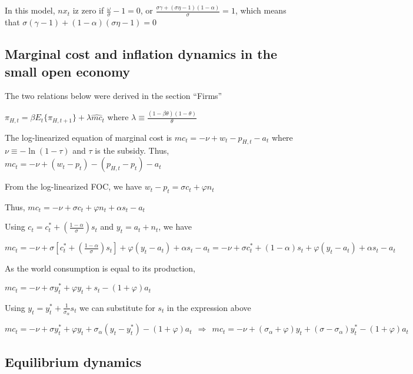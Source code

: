 \documentclass[
]{article}
\begin{document}
In this model, \(nx_t\) iz zero if
\(\displaystyle \frac{\omega}{\sigma} - 1=0\), or
\(\displaystyle \frac{\sigma \gamma + (\sigma \eta - 1)(1-\alpha)}{\sigma}=1\),
which means that \(\sigma (\gamma-1) + (1-\alpha)(\sigma \eta - 1)=0\)

\hypertarget{marginal-cost-and-inflation-dynamics-in-the-small-open-economy}{%
\subsection{Marginal cost and inflation dynamics in the small open
economy}\label{marginal-cost-and-inflation-dynamics-in-the-small-open-economy}}

The two relations below were derived in the section ``Firms''

\(\pi_{H,t} = \beta E_t \{ \pi_{H,t+1}\} + \lambda \widehat{mc}_t\)
where
\(\displaystyle \lambda \equiv \frac{(1-\beta \theta)(1-\theta)}{\theta}\)

The log-linearized equation of marginal cost is
\(mc_t = -\nu+w_t-p_{H,t}-a_t\) where \(\nu\equiv -\ln(1-\tau)\) and
\(\tau\) is the subsidy. Thus,
\(mc_t= -\nu + (w_t-p_t) - (p_{H,t}-p_t)-a_t\)

From the log-linearized FOC, we have
\(w_t-p_t=\sigma c_t + \varphi n_t\)

Thus, \(mc_t= -\nu + \sigma c_t + \varphi n_t + \alpha s_t -a_t\)

Using
\(\displaystyle c_t=c_t^*+ \left( \frac{1-\alpha}{\sigma} \right)s_t\)
and \(y_t = a_t + n_t\), we have

\(\displaystyle mc_t= -\nu + \sigma \left[ c_t^*+ \left( \frac{1-\alpha}{\sigma} \right)s_t \right] + \varphi (y_t-a_t) + \alpha s_t -a_t=-\nu + \sigma c_t^*+ ( 1-\alpha )s_t + \varphi (y_t-a_t) + \alpha s_t -a_t\)

As the world consumption is equal to its production,

\(\displaystyle mc_t =-\nu + \sigma y_t^*+ \varphi y_t+ s_t -(1+\varphi)a_t\)

Using \(\displaystyle y_t = y_t^* + \frac{1}{\sigma_\alpha}s_t\) we can
substitute for \(s_t\) in the expression above

\(\displaystyle mc_t =-\nu + \sigma y_t^*+ \varphi y_t+ \sigma_\alpha(y_t-y_t^*) -(1+\varphi)a_t \ \ \Rightarrow \ \ mc_t = -\nu + (\sigma_\alpha+\varphi)y_t + (\sigma-\sigma_\alpha)y_t^*-(1+\varphi)a_t\)

\hypertarget{equilibrium-dynamics}{%
\subsection{Equilibrium dynamics}\label{equilibrium-dynamics}}
\end{document}
